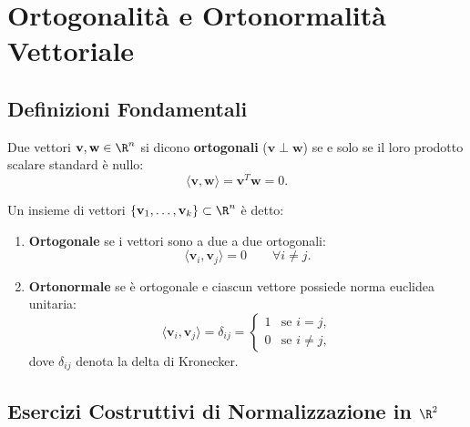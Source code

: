 \FloatBarrier
\section{Ortogonalit\`a e Ortonormalit\`a Vettoriale}

\subsection{Definizioni Fondamentali}

\begin{definition}
Due vettori $\mathbf{v}, \mathbf{w} \in \R^n$ si dicono \textbf{ortogonali} ($\mathbf{v} \perp \mathbf{w}$) se e solo se il loro prodotto scalare standard \`e nullo:
\begin{equation}
    \langle \mathbf{v}, \mathbf{w} \rangle = \mathbf{v}^T \mathbf{w} = 0.
\end{equation}
\end{definition}

\begin{definition}
Un insieme di vettori $\{\mathbf{v}_1, \dots, \mathbf{v}_k\} \subset \R^n$ \`e detto:
\mbox{}\par\nopagebreak
\begin{enumerate}
    \item \textbf{Ortogonale} se i vettori sono a due a due ortogonali:
    \begin{equation}
        \langle \mathbf{v}_i, \mathbf{v}_j \rangle = 0 \qquad \forall i \neq j.
    \end{equation}
    \item \textbf{Ortonormale} se \`e ortogonale e ciascun vettore possiede norma euclidea unitaria:
    \begin{equation}
        \langle \mathbf{v}_i, \mathbf{v}_j \rangle = \delta_{ij} = \begin{cases} 1 & \text{se } i = j, \\ 0 & \text{se } i \neq j, \end{cases}
    \end{equation}
    dove $\delta_{ij}$ denota la delta di Kronecker.
\end{enumerate}
\end{definition}

\subsection{Esercizi Costruttivi di Normalizzazione in \texorpdfstring{$\R^2$}{R2}}

